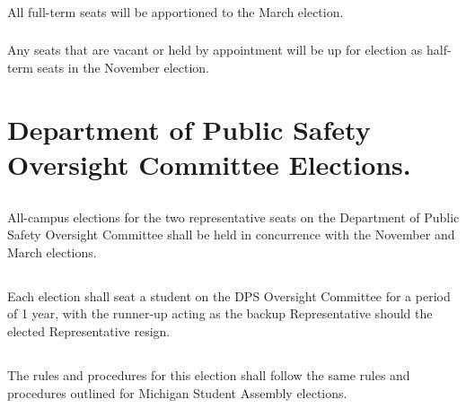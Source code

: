 \subsubsection{}
All full-term seats will be apportioned to the March election.
\subsubsection{}
Any seats that are vacant or held by appointment will be up for election as half-term seats in the November election.


\section{Department of Public Safety Oversight Committee Elections.}
\subsection{}
All-campus elections for the two representative seats on the Department of Public Safety Oversight Committee shall be held in concurrence with the November and March elections.
\subsection{}
Each election shall seat a student on the DPS Oversight Committee for a period of 1 year, with the runner-up acting as the backup Representative should the elected Representative resign.
\subsection{}
The rules and procedures for this election shall follow the same rules and procedures outlined for Michigan Student Assembly elections.

